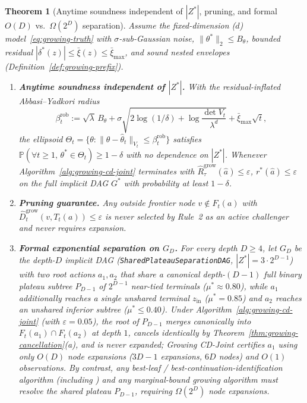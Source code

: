\documentclass{article}
\theoremstyle{plain}
\newtheorem{theorem}{Theorem}[section]
\theoremstyle{definition}
\begin{document}
\begin{theorem}[Anytime soundness independent of $|Z^*|$, pruning, and formal $O(D)$ vs.\ $\Omega(2^D)$ separation]
\label{thm:growing-separation}
Assume the fixed-dimension ($d$) model~\eqref{eq:growing-truth} with $\sigma$-sub-Gaussian noise, $\|\theta^*\|_2 \le B_\theta$, bounded residual $|\delta^*(z)| \le \bar\xi(z) \le \bar\xi_{\max}$, and sound nested envelopes (Definition~\ref{def:growing-prefix}).
\begin{enumerate}[label=(\alph*),leftmargin=1.8em]
  \item \textbf{Anytime soundness independent of $|Z^*|$.} With the residual-inflated Abbasi--Yadkori radius \citep{abbasi2011}
  \[
    \beta_t^{\mathrm{rob}}
    := \sqrt{\lambda}\, B_\theta
       + \sigma\sqrt{2\log(1/\delta) + \log\frac{\det V_t}{\lambda^d}}
       + \bar\xi_{\max}\sqrt{t},
  \]
  the ellipsoid $\Theta_t = \{\theta : \|\theta - \widehat\theta_t\|_{V_t} \le \beta_t^{\mathrm{rob}}\}$ satisfies $\mathbb{P}(\forall t \ge 1,\, \theta^* \in \Theta_t) \ge 1 - \delta$ with \emph{no dependence on $|Z^*|$}. Whenever Algorithm~\ref{alg:growing-cd-joint} terminates with $\widehat R_\tau^{\mathrm{grow}}(\hat a) \le \varepsilon$, $r^*(\hat a) \le \varepsilon$ on the full implicit DAG $G^*$ with probability at least $1 - \delta$.
  \item \textbf{Pruning guarantee.} Any outside frontier node $v \notin F_t(a)$ with $\widehat D_t^{\mathrm{grow}}(v, T_t(a)) \le \varepsilon$ is never selected by Rule~2 as an active challenger and never requires expansion.
  \item \textbf{Formal exponential separation on $G_D$.} For every depth $D \ge 4$, let $G_D$ be the depth-$D$ implicit DAG (\texttt{SharedPlateauSeparationDAG}, $|Z^*| = 3 \cdot 2^{D-1}$) with two root actions $a_1, a_2$ that share a canonical depth-$(D-1)$ full binary plateau subtree $P_{D-1}$ of $2^{D-1}$ near-tied terminals ($\mu^* \approx 0.80$), while $a_1$ additionally reaches a single unshared terminal $z_{\mathrm{in}}$ ($\mu^* = 0.85$) and $a_2$ reaches an unshared inferior subtree ($\mu^* \le 0.40$). Under Algorithm~\ref{alg:growing-cd-joint} (with $\varepsilon = 0.05$), the root of $P_{D-1}$ merges canonically into $F_t(a_1) \cap F_t(a_2)$ at depth $1$, cancels identically by Theorem~\ref{thm:growing-cancellation}(a), and is never expanded; \emph{Growing CD-Joint} certifies $a_1$ using only $O(D)$ node expansions ($3D - 1$ expansions, $6D$ nodes) and $O(1)$ observations. By contrast, any best-leaf / best-continuation-identification algorithm (including \citealt{pelissier}) and any marginal-bound growing algorithm must resolve the shared plateau $P_{D-1}$, requiring $\Omega(2^D)$ node expansions.
\end{enumerate}
\end{theorem}
\end{document}
